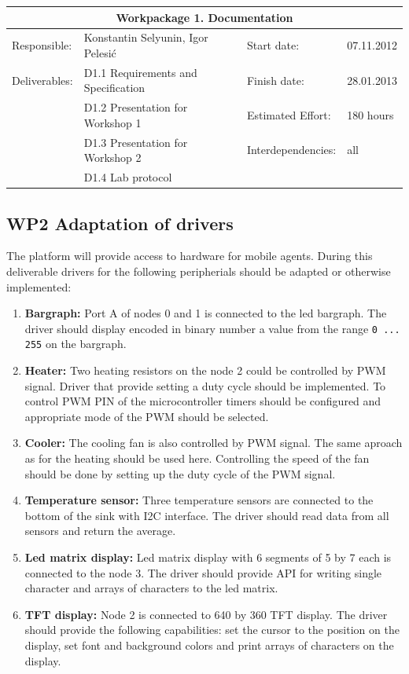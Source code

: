 \documentclass{scrreprt}
\begin{document}
\vspace{0.2in}
\begin{tabular}{|ll|ll|}
\hline \multicolumn{4}{|c|}{\textbf{Workpackage 1. Documentation}}\\
\hline
Responsible:	&  Konstantin Selyunin, Igor Pelesi\'c	& Start date:		& 07.11.2012 \\
Deliverables:	&  D1.1 Requirements and Specification  & Finish date:	 	& 28.01.2013\\
		&  D1.2 Presentation for Workshop 1	& Estimated Effort: 	& 180 hours \\
		&  D1.3 Presentation for Workshop 2	& Interdependencies:	& all	\\
		&  D1.4 Lab protocol			& 			& 	\\
\hline
\end{tabular}

	\subsection{WP2 Adaptation of drivers}

The platform will provide access to hardware for mobile agents.
During this deliverable drivers for the following peripherials should be adapted or otherwise implemented:
\begin{enumerate}

\item{\textbf{Bargraph:} Port A of nodes 0 and 1 is connected to the led bargraph.
The driver should display encoded in binary number a value from the range \texttt{0 ... 255} on the bargraph.
}


\item{\textbf{Heater:} Two heating resistors on the node 2 could be controlled by PWM signal.
Driver that provide setting a duty cycle should be implemented.
To control PWM PIN of the microcontroller timers should be configured and appropriate mode of the PWM should be selected.
}

\item{\textbf{Cooler:} The cooling fan is also controlled by PWM signal.
The same aproach as for the heating should be used here.
Controlling the speed of the fan should be done by setting up the duty cycle of the PWM signal.
}

\item{\textbf{Temperature sensor:} 
Three temperature sensors are connected to the bottom of the sink with I2C interface.
The driver should read data from all sensors and return the average.
}

\item{\textbf{Led matrix display:} 
Led matrix display with 6 segments of 5 by 7 each is connected to the node 3.
The driver should provide API for writing single character and arrays of characters to the led matrix.
}

\item{\textbf{TFT display:} 
Node 2 is connected to 640 by 360 TFT display.
The driver should provide the following capabilities: 
set the cursor to the position on the display,
set font and background colors and print arrays of characters on the display.
}
\end{enumerate}
\end{document}
